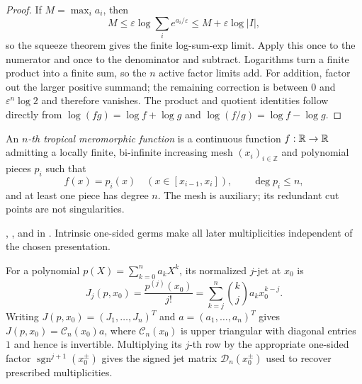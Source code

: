 \begin{proof}
\leanok
If $M=\max_i a_i$, then
\[
 M\leq\varepsilon\log\sum_i e^{a_i/\varepsilon}
 \leq M+\varepsilon\log|I|,
\]
so the squeeze theorem gives the finite log-sum-exp limit.  Apply this once
to the numerator and once to the denominator and subtract.  Logarithms turn a
finite product into a finite sum, so the $n$ active factor limits add.  For
addition, factor out the larger positive summand; the remaining correction is
between $0$ and $\varepsilon^n\log2$ and therefore vanishes.  The product and
quotient identities follow directly from $\log(fg)=\log f+\log g$ and
$\log(f/g)=\log f-\log g$.
\end{proof}

\begin{definition}
\leanok
An \emph{$n$-th tropical meromorphic function} is a continuous function
$f:\mathbb R\to\mathbb R$ admitting a locally finite, bi-infinite increasing mesh
$(x_i)_{i\in\mathbb Z}$ and polynomial pieces $p_i$ such that
\[
 f(x)=p_i(x)\quad(x\in[x_{i-1},x_i]),\qquad
 \deg p_i\leq n,
\]
and at least one piece has degree $n$.  The mesh is auxiliary; its redundant
cut points are not singularities.
\end{definition}

\begin{leanproof}
, , and
 in
.  Intrinsic one-sided germs make all
later multiplicities independent of the chosen presentation.
\end{leanproof}

\begin{definition}
\leanok
For a polynomial $p(X)=\sum_{k=0}^na_kX^k$, its normalized $j$-jet at
$x_0$ is
\[
 J_j(p,x_0)=\frac{p^{(j)}(x_0)}{j!}
 =\sum_{k=j}^n\binom{k}{j}a_kx_0^{k-j}.
\]
Writing $J(p,x_0)=(J_1,\ldots,J_n)^T$ and
$a=(a_1,\ldots,a_n)^T$ gives $J(p,x_0)=\mathcal C_n(x_0)a$, where
$\mathcal C_n(x_0)$ is upper triangular with diagonal entries $1$ and hence
is invertible.  Multiplying its $j$-th row by the appropriate one-sided factor
$\operatorname{sgn}^{j+1}(x_0^\pm)$ gives the signed jet matrix
$\mathcal D_n(x_0^\pm)$ used to recover prescribed multiplicities.
\end{definition}

